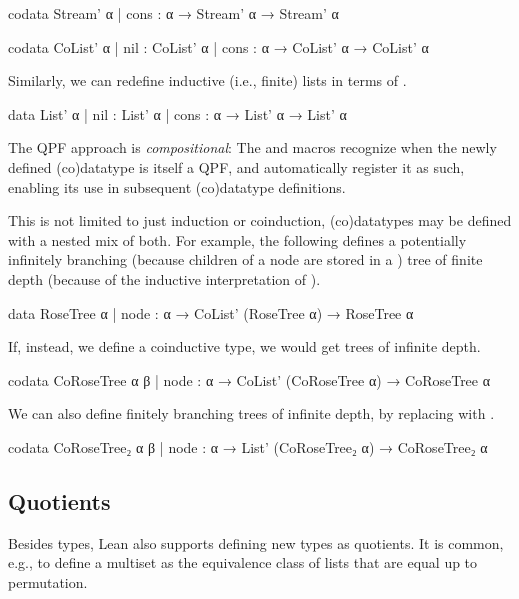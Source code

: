 \begin{leancode}
  codata Stream' α
    | cons : α → Stream' α → Stream' α 

  codata CoList' α 
    | nil  : CoList' α
    | cons : α → CoList' α → CoList' α
\end{leancode}

Similarly, we can redefine inductive (i.e., finite) lists in terms of \data{}.

\begin{leancode}
  data List' α 
    | nil  : List' α
    | cons : α → List' α → List' α
\end{leancode}


The QPF approach is \emph{compositional}:
The \data{} and \codata{} macros recognize when the newly defined (co)datatype is itself a QPF, and automatically register it as such, enabling its use in subsequent (co)datatype definitions.



This is not limited to just induction or coinduction, (co)datatypes may be defined with a nested mix of both.
For example, the following defines a potentially infinitely branching (because children of a node are stored in a ) tree of finite depth (because of the inductive interpretation of \data).

\begin{leancode}
  data RoseTree α
    | node : α → CoList' (RoseTree α) → RoseTree α
\end{leancode}

If, instead, we define a coinductive type, we would get trees of infinite depth.
\begin{leancode}
  codata CoRoseTree α β
    | node : α → CoList' (CoRoseTree α) → CoRoseTree α
\end{leancode}

We can also define finitely branching trees of infinite depth, by replacing  with .
\begin{leancode}
  codata CoRoseTree₂ α β
    | node : α → List' (CoRoseTree₂ α) → CoRoseTree₂ α
\end{leancode}


\subsection*{Quotients}
Besides \inductive{} types, Lean also supports defining new types as quotients.
It is common, e.g., to define a multiset as the equivalence class of lists that are equal up to permutation.

